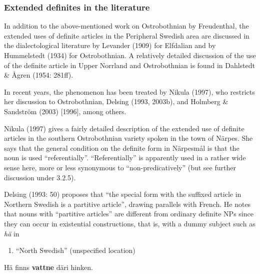 \subsubsection[Extended definites in the literature]{\rmfamily Extended definites in the literature}
In addition to the above-mentioned work on Ostrobothnian by Freudenthal, the extended uses of definite articles in the Peripheral Swedish area are discussed in the dialectological literature by Levander (1909) for Elfdalian and by Hummelstedt (1934) for Ostrobothnian. A relatively detailed discussion of the use of the definite article in Upper Norrland and Ostrobothnian is found in Dahlstedt \& Ågren (1954: 281ff). 

In recent years, the phenomenon has been treated by Nikula (1997), who restricts her discussion to Ostrobothnian, Delsing (1993, 2003b), and Holmberg \& Sandström (2003) [1996], among others.

Nikula (1997) gives a fairly detailed description of the extended use of definite articles in the southern Ostrobothnian variety spoken in the town of Närpes. She says that the general condition on the definite form in Närpesmål is that the noun is used “referentially”. “Referentially” is apparently used in a rather wide sense here, more or less synonymous to “non-predicatively” (but see further discussion under 3.2.5). 

Delsing (1993: 50) proposes that “the special form with the suffixed article in Northern Swedish is a partitive article”, drawing parallels with French. He notes that nouns with “partitive articles” are different from ordinary definite NPs since they can occur in existential constructions, that is, with a dummy subject such as \textit{hä} in 

\begin{enumerate} %
\item 
“North Swedish” (unspecified location)

\end{enumerate} %
\ea\label{}
\gll Hä  finns  \textbf{vattne} däri  hinken.\\


